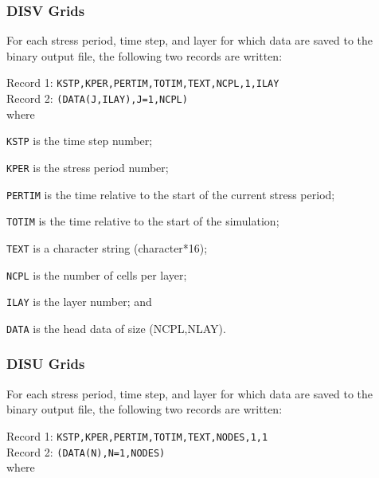 \subsubsection{DISV Grids}
For each stress period, time step, and layer for which data are saved to the binary output file, the following two records are written:

\vspace{5mm}
\noindent Record 1: \texttt{KSTP,KPER,PERTIM,TOTIM,TEXT,NCPL,1,ILAY} \\
\noindent Record 2: \texttt{(DATA(J,ILAY),J=1,NCPL)} \\

\vspace{5mm}
\noindent where

\begin{description} \itemsep0pt \parskip0pt 
\item \texttt{KSTP} is the time step number;
\item \texttt{KPER} is the stress period number;
\item \texttt{PERTIM} is the time relative to the start of the current stress period; 
\item \texttt{TOTIM} is the time relative to the start of the simulation;
\item \texttt{TEXT} is a character string (character*16);
\item \texttt{NCPL} is the number of cells per layer;
\item \texttt{ILAY} is the layer number; and
\item \texttt{DATA} is the head data of size (NCPL,NLAY).
\end{description}

\newpage
\subsubsection{DISU Grids}
For each stress period, time step, and layer for which data are saved to the binary output file, the following two records are written:

\vspace{5mm}
\noindent Record 1: \texttt{KSTP,KPER,PERTIM,TOTIM,TEXT,NODES,1,1} \\
\noindent Record 2: \texttt{(DATA(N),N=1,NODES)} \\

\vspace{5mm}
\noindent where

